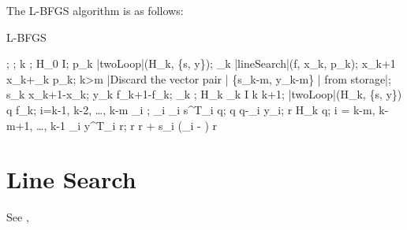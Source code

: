 



The L-BFGS algorithm is as follows:

\begin{algorithm}
    \mbox{L-BFGS}
    \begin{program}
        \BEGIN
        ;
        ;
        k ;
        H_0 \leftarrow I;
        \WHILE \NOT{} \DO
        p_k \leftarrow |twoLoop|(H_k, \{s, y\});
        \alpha_k \leftarrow |lineSearch|(f, x_k, p_k); 
        x_{k+1} \leftarrow x_k+\alpha_k p_k;
        \IF k>m
        \THEN
            |Discard the vector pair | \{s_{k-m}, y_{k-m}\} | from storage|;
        \FI
        s_k \leftarrow x_{k+1}-x_k;
        y_k \leftarrow \nabla f_{k+1}-\nabla f_k;
        \gamma_k \leftarrow {};
        H_k \leftarrow \gamma_k I
        k \leftarrow k+1;
        \OD
        \WHERE
        \FUNCT |twoLoop|(H_k, \{s, y\}) \BODY
            \EXP q \leftarrow \nabla f_k;
            \FOR i=k-1, k-2, \ldots, k-m \DO
            \rho_i \leftarrow {};
            \alpha_i \leftarrow \rho_i s^T_i q;
            q \leftarrow q-\alpha_i y_i;
            \OD
            r \leftarrow H_k q;
            \FOR i = k-m, k-m+1, \ldots, k-1 \DO
            \beta \leftarrow \rho_i y^T_i r;
            r \leftarrow r + s_i (\alpha_i - \beta)
            \OD
            r \ENDEXP \ENDFUNCT
        \END
    \end{program}
\end{algorithm}

\section{Line Search}\label{sec:LineSearch}
See \cite{Nocedal2006}, \cite{MoreThuente1992}

